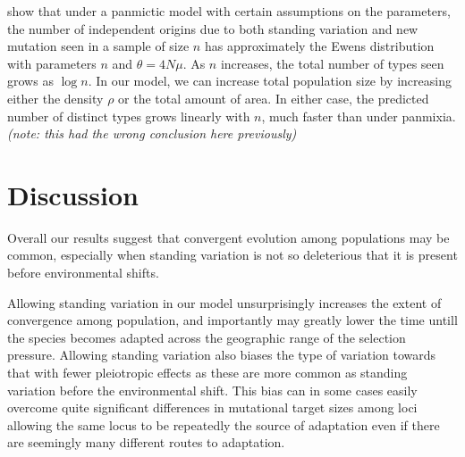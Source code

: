 \documentclass{article}
\newcommand{\plr}[1]{{\it\color{blue}(#1)}}
\begin{document}

\citet{softsweepsII} show that under a panmictic model with certain assumptions on the parameters,
the number of independent origins due to both standing variation and new mutation seen in a sample of size $n$
has approximately the Ewens distribution with parameters $n$ and $\theta = 4 N \mu$.
As $n$ increases, the total number of types seen grows as $\log n$.
In our model, we can increase total population size by increasing either the density $\rho$ or the total amount of area.
In either case, the predicted number of distinct types grows linearly with $n$,
much faster than under panmixia.
\plr{note: this had the wrong conclusion here previously}


\section{Discussion}

Overall our results suggest that convergent evolution among
populations may be common, especially when standing variation is not
so deleterious that it is present before environmental shifts. 

Allowing standing variation in our model unsurprisingly increases the
extent of convergence among population, and importantly may greatly
lower the time untill the species becomes adapted across the
geographic range of the selection pressure. Allowing standing
variation also biases the type of variation towards that with fewer
pleiotropic effects as these are more common as standing variation 
before the environmental shift. This bias can in some cases easily
overcome quite significant differences in mutational target sizes
among loci allowing the same locus to be repeatedly the source of
adaptation even if there are seemingly many different routes to adaptation.
\end{document}

